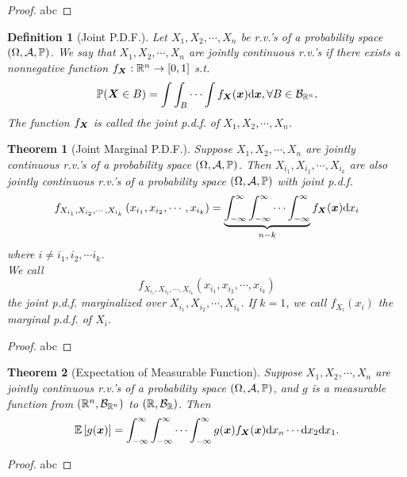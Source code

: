 \documentclass[openany,12pt]{book}
\newtheorem{theorem}{Theorem}[chapter]
\newtheorem{definition}{Definition}[chapter]
\begin{document}
\begin{proof}
  abc
\end{proof}

\begin{definition}[Joint P.D.F.]
  Let $X_1, X_2, \cdots,X_n$ be r.v.'s of a probability space $(\Omega,\mathcal{A},\mathbb{P})$. We say that $X_1, X_2, \cdots,X_n$ are jointly continuous r.v.'s if there exists a nonnegative function $f_{\bm{X}}:\mathbb{R}^n\to[0,1]$ s.t.
  $$
    \mathbb{P}(\bm{X}\in B)=\int\int_{B}\cdots\int f_{\bm{X}}(\bm{x})\mathrm{d} \bm{x},  \forall B\in\mathcal{B}_{\mathbb{R}^n}.
  $$
  The function $f_{\bm{X}}$ is called the joint p.d.f. of $X_1, X_2, \cdots,X_n$.
\end{definition}

\begin{theorem}[Joint Marginal P.D.F.]
  Suppose $X_1, X_2, \cdots,X_n$ are jointly continuous r.v.'s of a probability space $(\Omega,\mathcal{A},\mathbb{P})$. Then $X_{i_1},X_{i_2}, \cdots,X_{i_k}$ are also jointly continuous r.v.'s of a probability space $(\Omega,\mathcal{A},\mathbb{P})$ with joint p.d.f.
  $$
    f_{X_{i_1},X_{i_2}, \cdots,X_{i_k}}\left(x_{i_1},x_{i_2}, \cdots,x_{i_k}\right)=\underbrace{\int_{-\infty}^{\infty}\int_{-\infty}^{\infty}\cdots\int_{-\infty}^{\infty}}_{n-k}{f_{\bm{X}}(\bm{x})\mathrm{d} x_i}
  $$
  where $i\neq i_1,i_2,\cdots i_k$.\\
  We call $$f_{X_{i_1},X_{i_2}, \cdots,X_{i_k}}\left(x_{i_1},x_{i_2}, \cdots,x_{i_k}\right)$$ the joint p.d.f. marginalized over $X_{i_1},X_{i_2}, \cdots,X_{i_k}$. If $k=1$, we call $f_{X_i}(x_i)$ the marginal p.d.f. of $X_i$.
\end{theorem}

\begin{proof}
  abc
\end{proof}

\begin{theorem}[Expectation of Measurable Function]
  Suppose $X_1, X_2, \cdots,X_n$ are jointly continuous r.v.'s of a probability space $(\Omega,\mathcal{A},\mathbb{P})$, and $g$ is a measurable function from $(\mathbb{R}^n, \mathcal{B}_{\mathbb{R}^n})$ to $(\mathbb{R},\mathcal{B}_\mathbb{R})$. Then
  $$
    \mathbb{E}\left[g(\bm{x})\right]=\int_{-\infty}^{\infty}\int_{-\infty}^{\infty}{\cdots\int_{-\infty}^{\infty}{g(\bm{x})f_{\bm{X}}(\bm{x})\mathrm{d} x_n\cdots \mathrm{d} x_2\mathrm{d} x_1}}.
  $$
\end{theorem}

\begin{proof}
  abc
\end{proof}
\end{document}
